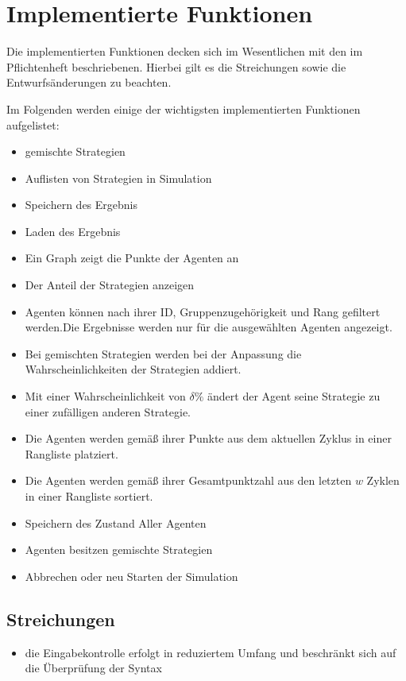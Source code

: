 \section{Implementierte Funktionen}

Die implementierten Funktionen decken sich im Wesentlichen mit den im Pflichtenheft beschriebenen. Hierbei gilt es die Streichungen sowie die Entwurfsänderungen zu beachten.

Im Folgenden werden einige der wichtigsten implementierten Funktionen aufgelistet:
\begin{itemize}
\item gemischte Strategien 

\item Auflisten von Strategien in Simulation

\item Speichern des Ergebnis

\item Laden des Ergebnis

\item Ein Graph zeigt die Punkte der Agenten an

\item Der Anteil der Strategien anzeigen

\item Agenten können nach ihrer ID, Gruppenzugehörigkeit und Rang gefiltert werden.Die Ergebnisse werden nur für die ausgewählten Agenten angezeigt.

\item Bei gemischten Strategien werden bei der Anpassung die Wahrscheinlichkeiten der Strategien addiert.

\item Mit einer Wahrscheinlichkeit von $\delta\%$ ändert der Agent seine Strategie zu einer zufälligen anderen Strategie.

\item Die Agenten werden gemäß ihrer Punkte aus dem aktuellen Zyklus in einer Rangliste platziert.

\item Die Agenten werden gemäß ihrer Gesamtpunktzahl aus den letzten $w$ Zyklen in einer Rangliste sortiert.

\item Speichern des Zustand Aller Agenten

\item Agenten besitzen gemischte Strategien

\item Abbrechen oder neu Starten der Simulation
\end{itemize}

\subsection{Streichungen}

\begin{itemize}
\item die Eingabekontrolle erfolgt in reduziertem Umfang und beschränkt sich auf die Überprüfung der Syntax
\end{itemize}